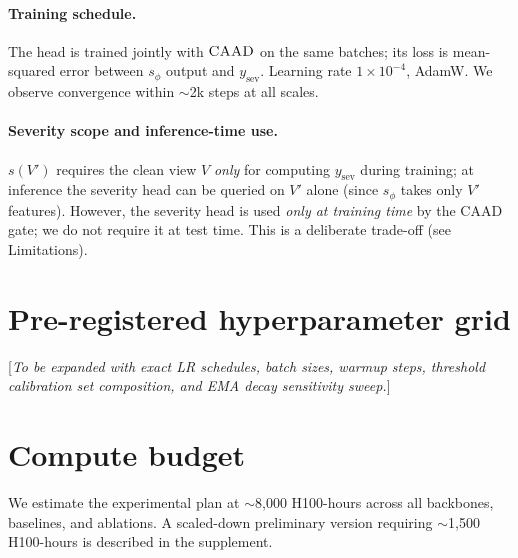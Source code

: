 \documentclass{article}
\newcommand{\caad}{\textsc{CAAD}}
\begin{document}
\paragraph{Training schedule.}
The head is trained jointly with $\caad{}$ on the same batches; its loss is mean-squared error between $s_\phi$ output and $y_{\text{sev}}$. Learning rate $1\!\times\!10^{-4}$, AdamW. We observe convergence within $\sim$2k steps at all scales.

\paragraph{Severity scope and inference-time use.}
$s(V')$ requires the clean view $V$ \emph{only} for computing $y_{\text{sev}}$ during training; at inference the severity head can be queried on $V'$ alone (since $s_\phi$ takes only $V'$ features). However, the severity head is used \emph{only at training time} by the \caad{} gate; we do not require it at test time. This is a deliberate trade-off (see Limitations).

\section{Pre-registered hyperparameter grid}

[\emph{To be expanded with exact LR schedules, batch sizes, warmup steps, threshold calibration set composition, and EMA decay sensitivity sweep.}]

\section{Compute budget}

We estimate the experimental plan at $\sim$8{,}000 H100-hours across all backbones, baselines, and ablations. A scaled-down preliminary version requiring $\sim$1{,}500 H100-hours is described in the supplement.
\end{document}
